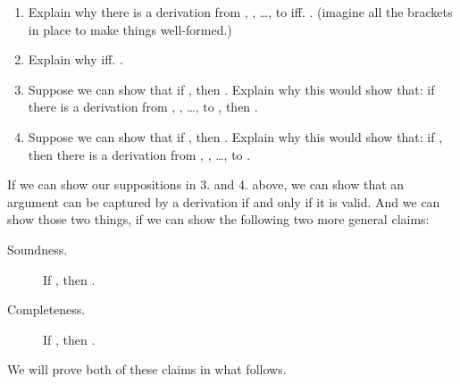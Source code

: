 \begin{enumerate}

 \item Explain why there is a derivation from ,  
  , \ldots ,  to  iff. . (imagine all the brackets in place to make things well-formed.)

 \item Explain why  iff.  
  .

  \item Suppose we can show that if , then .  Explain why this would show that: if there is a derivation 
   from ,  , \ldots ,  to 
  , then .

  \item Suppose we can show that if , then .  Explain why this would show that: if , then there is a derivation from ,  
   , \ldots ,  to .


\end{enumerate}

If we can show our suppositions in  3. and 4. above, we can show that an 
argument can be captured by a derivation if and only if it is valid. And we can 
show those two things, if we can show the following two more general claims:

\begin{description}

 \item[Soundness.] If , then  .

 \item[Completeness.] If , then .

\end{description}

We will prove both of these claims in what follows.


